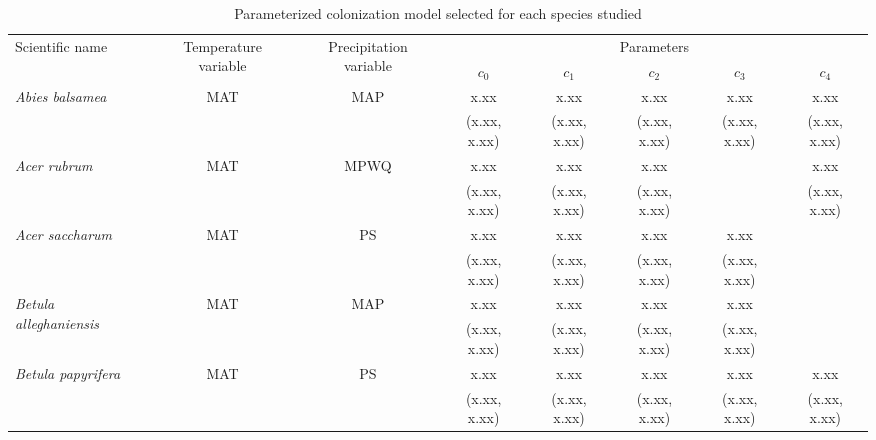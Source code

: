 \documentclass[11pt]{article}
\begin{document}

\newcommand{\ts}{\scriptsize}
\begin{table}[tb]
\small
\begin{threeparttable}
\label{tab:model_selection}
\caption{Parameterized colonization model selected for each species studied}
\begin{tabular}{lccccccc}
\toprule
\multirow{2}{*}{Scientific name} & \multirow{2}{2cm}{\centering Temperature variable\tnote{*}} & 
\multirow{2}{2cm}{\centering Precipitation variable\tnote{\textdagger}} & \multicolumn{5}{c}{Parameters\tnote{\textdaggerdbl}} \\
& & & $c_0$ & $c_1$ & $c_2$ & $c_3$ & $c_4$ \\ 
\midrule

\multirow{2}{*}{\it Abies balsamea} & \multirow{2}{*}{MAT} & \multirow{2}{*}{MAP} & x.xx\tnote{\textsection} & x.xx & x.xx & x.xx & x.xx \\
 &  &  & {\ts (x.xx, x.xx)} & {\ts (x.xx, x.xx)} & {\ts (x.xx, x.xx)} & {\ts (x.xx, x.xx)} & {\ts (x.xx, x.xx)} \\

\multirow{2}{*}{\it Acer rubrum} & \multirow{2}{*}{MAT} & \multirow{2}{*}{MPWQ} & x.xx & x.xx & x.xx &  & x.xx \\
 &  &  & {\ts (x.xx, x.xx)} & {\ts (x.xx, x.xx)} & {\ts (x.xx, x.xx)} &  & {\ts (x.xx, x.xx)} \\

\multirow{2}{*}{\it Acer saccharum} & \multirow{2}{*}{MAT} & \multirow{2}{*}{PS} & x.xx & x.xx & x.xx & x.xx &  \\
 &  &  & {\ts (x.xx, x.xx)} & {\ts (x.xx, x.xx)} & {\ts (x.xx, x.xx)} & {\ts (x.xx, x.xx)} &  \\

\multirow{2}{*}{\it Betula alleghaniensis} & \multirow{2}{*}{MAT} & \multirow{2}{*}{MAP} & x.xx & x.xx & x.xx & x.xx & \\
 &  &  & {\ts (x.xx, x.xx)} & {\ts (x.xx, x.xx)} & {\ts (x.xx, x.xx)} & {\ts (x.xx, x.xx)} & \\

\multirow{2}{*}{\it Betula papyrifera} & \multirow{2}{*}{MAT} & \multirow{2}{*}{PS} & x.xx & x.xx & x.xx & x.xx & x.xx \\
 &  &  & {\ts (x.xx, x.xx)} & {\ts (x.xx, x.xx)} & {\ts (x.xx, x.xx)} & {\ts (x.xx, x.xx)} & {\ts (x.xx, x.xx)} \\


\end{tabular}
\end{threeparttable}
\end{table}
\end{document}
